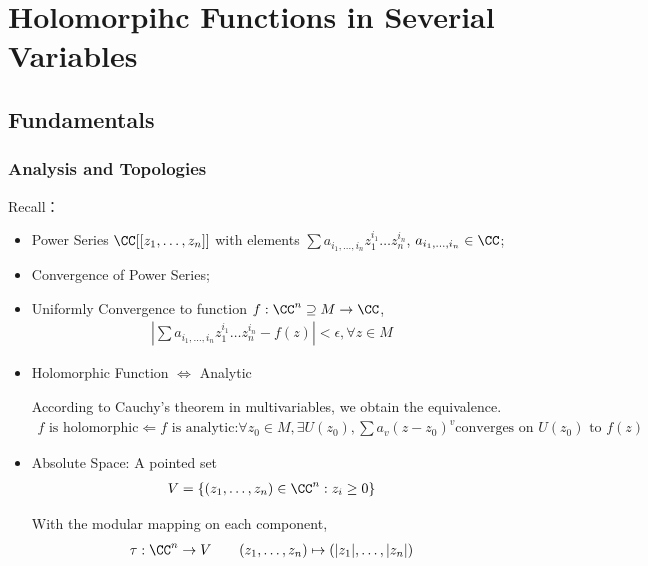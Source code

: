 \documentclass[Total.tex]{subfiles}
\begin{document}
	\chapter{Holomorpihc Functions in Severial Variables}
		\section{Fundamentals}
			\subsection{Analysis and Topologies}
				Recall：
				\begin{itemize}
					\item Power Series $\CC[[z_1,\dots,z_n]]$ with elements $\sum a_{i_1,\dots,i_n}z_1^{i_1}\dots z_n^{i_n}$, $a_{i_1,\dots,i_n}\in \CC$;
					\item Convergence of Power Series;
					\item Uniformly Convergence to function $f:\CC^n\supseteq M\rightarrow \CC$,
					\begin{gather*}
						|\sum a_{i_1,\dots,i_n}z_1^{i_1}\dots z_n^{i_n}-f(z)|<\epsilon, \forall z\in M
					\end{gather*}
					\item Holomorphic Function $\Leftrightarrow$ Analytic
					
					According to Cauchy's theorem in multivariables, we obtain the equivalence.
					\begin{gather*}
						f\mbox{ is holomorphic}\Leftarrow f\mbox{ is analytic:} \forall z_0\in M,\exists U(z_0),
						\sum a_v(z-z_0)^v \mbox{converges on }U(z_0)\mbox{ to }f(z)
					\end{gather*}
					\item Absolute Space: A pointed set 
					\begin{gather*}
						V=\{(z_1,\dots,z_n)\in \CC^n:z_i\geq 0\}
					\end{gather*}

					With the modular mapping on each component,\begin{gather*}
						\tau:\CC^n\rightarrow V\qquad (z_1,\dots,z_n)\mapsto (|z_1|,\dots,|z_n|)
					\end{gather*}
				\end{itemize}
\end{document}
